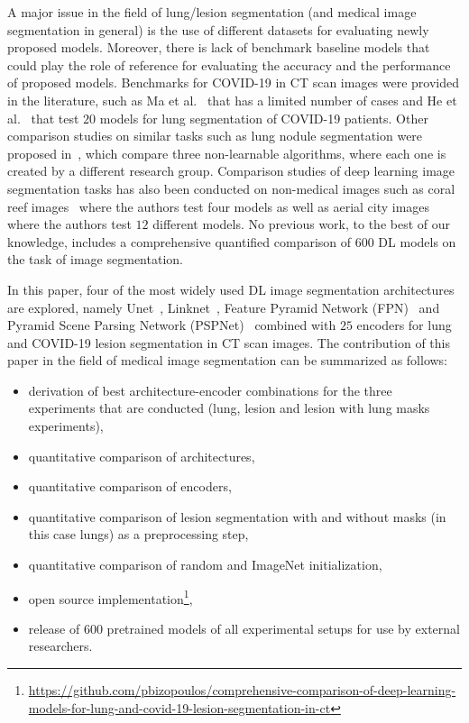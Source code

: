 \documentclass{elsarticle}
\begin{document}
A major issue in the field of lung/lesion segmentation (and medical
image segmentation in general) is the use of different datasets for
evaluating newly proposed models.
Moreover, there is lack of benchmark baseline models that could play
the role of reference for evaluating the accuracy and the performance
of proposed models.
Benchmarks for COVID-19 in CT scan images were provided in the
literature, such as Ma et al.~\cite{ma2020towards} that has a limited
number of cases and He et al.~\cite{he2020benchmarking} that test
$20$ models for lung segmentation of COVID-19 patients.
Other comparison studies on similar tasks such as lung nodule
segmentation were proposed in~\cite{kalpathy2016comparison}, which
compare three non-learnable algorithms, where each one is created by
a different research group.
Comparison studies of deep learning image segmentation tasks has also
been conducted on non-medical images such as coral reef
images~\cite{king2018comparison} where the authors test four models
as well as aerial city images~\cite{liu2018comparison} where the
authors test $12$ different models.
No previous work, to the best of our knowledge, includes a
comprehensive quantified comparison of $600$ DL models on the task of
image segmentation.

In this paper, four of the most widely used DL image segmentation
architectures are explored, namely Unet~\cite{ronneberger2015u},
Linknet~\cite{chaurasia2017linknet}, Feature Pyramid Network
(FPN)~\cite{lin2017feature} and Pyramid Scene Parsing Network
(PSPNet)~\cite{zhao2017pyramid} combined with $25$ encoders for lung
and COVID-19 lesion segmentation in CT scan images.
The contribution of this paper in the field of medical image
segmentation can be summarized as follows:
\begin{itemize}
  \item derivation of best architecture-encoder combinations for the
    three experiments that are conducted (lung, lesion and lesion
    with lung masks experiments),
  \item quantitative comparison of architectures,
  \item quantitative comparison of encoders,
  \item quantitative comparison of lesion segmentation with and
    without masks (in this case lungs) as a preprocessing step,
  \item quantitative comparison of random and ImageNet initialization,
  \item open source
    implementation\footnote{\url{https://github.com/pbizopoulos/comprehensive-comparison-of-deep-learning-models-for-lung-and-covid-19-lesion-segmentation-in-ct}},
  \item release of $600$ pretrained models of all experimental setups
    for use by external researchers.
\end{itemize}
\end{document}
